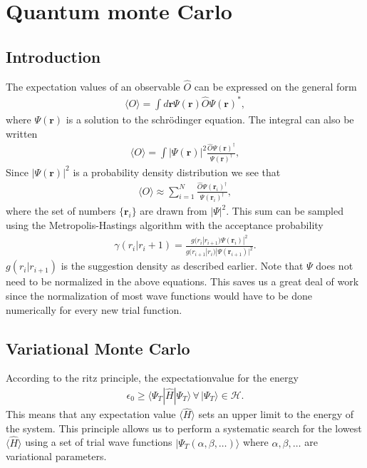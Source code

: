 \documentclass[a4paper,10pt,twocolumn]{article} %
\newcommand{\ts}[1]{\textbf{#1}}
\newcommand{\bra}[1]{\langle{#1}|}
\newcommand{\ket}[1]{|#1\rangle{}}
\newcommand{\expec}[1]{\langle{}{#1}\rangle{}}
\begin{document}

\section{Quantum monte Carlo}%

\subsection{Introduction}%

The expectation values of an observable $\hat O$ can be expressed on the general form
\begin{align}
	\expec{ O } = \int d\ts r \Psi(\ts r) \hat O \Psi(\ts r)^*,\label{exv}
\end{align}
where $\Psi(\ts r)$ %
is a solution to the schrödinger equation. 
The integral can also be written 
\begin{align}
	\expec{ O } = \int |\Psi(\ts r)|^2 \frac{ \hat O \Psi(\ts r)^\dagger } {\Psi(\ts r)^\dagger},
\end{align}
Since $|\Psi(\ts r)|^2$ is a probability density distribution we see that
\begin{align}
	\expec{ O } \approx \sum_{i=1}^N \frac{ \hat O \Psi(\ts r_i)^\dagger } {\Psi(\ts r_i)^\dagger}, \label{RFQMC1} 
\end{align}
%
where the set of numbers $\{\ts r_i\}$ are drawn from $|\Psi|^2$.
This sum can be sampled using the Metropolis-Hastings algorithm with the acceptance probability 
\begin{align}
	\gamma(r_i|r_i+1)=\frac
		{g(r_i|r_{i+1})\Psi(\ts r_i)|^2}
		{g(r_{i+1}|r_i)|\Psi(\ts r_{i+1})|^2}.
\end{align} 
$g(r_i|r_{i+1})$ is the suggestion density as described earlier.
%
Note that $\Psi$ does not need to be normalized in the above equations. This saves us a great deal of work since the normalization 
of most wave functions would have to be done numerically for every new trial function.%


\subsection{Variational Monte Carlo}%

According to the ritz principle, the expectationvalue for the energy 
\begin{align}
	\epsilon_0\ge\bra{\Psi_T} \hat H \ket{\Psi_T}\,\forall\,\ket{\Psi_T}\in\mathcal H.
\end{align} 
%
This means that any expectation value $\expec{\hat H}$ sets an upper limit to the energy of the system. 
%
This principle allows us to perform a systematic search for the lowest $\expec{\hat H}$ using a set of trial wave functions 
$\ket{\Psi_T(\alpha,\beta,\dots)}$ where $\alpha,\beta,\dots$ are variational parameters. %
\end{document}
